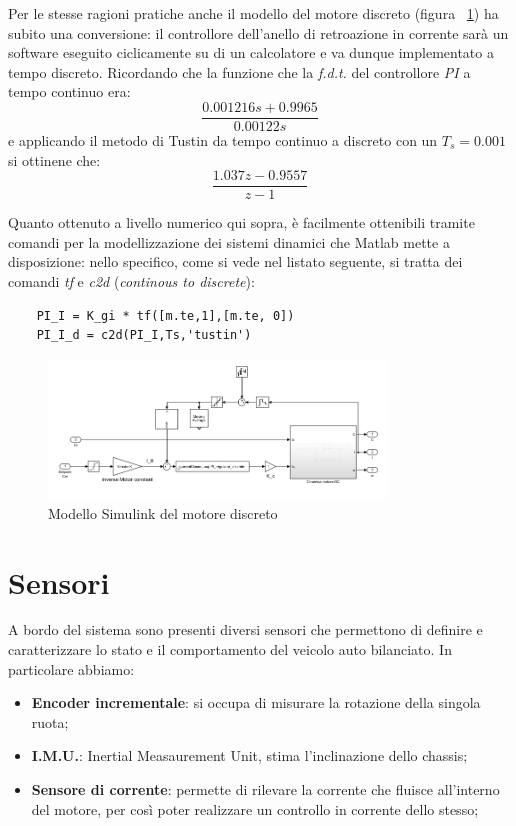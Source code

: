 Per le stesse ragioni pratiche anche il modello del motore discreto (figura ~\ref{fig:discrete_motor}) ha subito una conversione: il controllore dell'anello di retroazione in corrente sarà un software eseguito ciclicamente su di un calcolatore e va dunque implementato a tempo discreto.
Ricordando che la funzione che la \textit{f.d.t.} del controllore \textit{PI} a tempo continuo era:
$$\dfrac{0.001216 s + 0.9965}{0.00122 s}$$
e applicando il metodo di Tustin da tempo continuo a discreto con un $T_s = 0.001$ si ottinene che:
$$\dfrac{1.037 z - 0.9557}{z - 1}$$

Quanto ottenuto a livello numerico qui sopra, è facilmente ottenibili tramite comandi per la modellizzazione dei sistemi dinamici che Matlab mette a disposizione: nello specifico, come si vede nel listato seguente, si tratta dei comandi \textit{tf} e \textit{c2d} (\textit{continous to discrete}):
\begin{lstlisting}
	PI_I = K_gi * tf([m.te,1],[m.te, 0])
	PI_I_d = c2d(PI_I,Ts,'tustin')
\end{lstlisting}

\begin{figure}[H]
	\centering   	
	\includegraphics[width=0.8\textwidth]{Immagini/discrete_motor.png}
	\caption{Modello Simulink del motore discreto}
	\label{fig:discrete_motor}
\end{figure}

\section{Sensori}
A bordo del sistema sono presenti diversi sensori che permettono di definire e caratterizzare lo stato e il comportamento del veicolo auto bilanciato. In particolare abbiamo:
\begin{itemize}
	\item \textbf{Encoder incrementale}: si occupa di misurare la rotazione della singola ruota;
	\item \textbf{I.M.U.}: Inertial Measaurement Unit, stima l'inclinazione dello chassis;
	\item \textbf{Sensore di corrente}: permette di rilevare la corrente che fluisce all'interno del motore, per così poter realizzare un controllo in corrente dello stesso;
\end{itemize}

